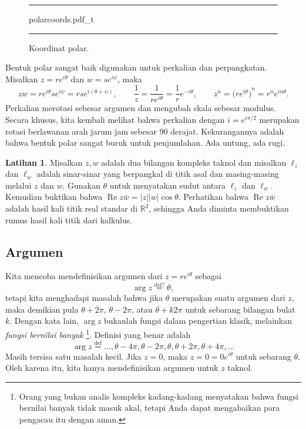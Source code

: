 \documentclass[12pt,openany]{book}
\renewcommand{\Re}{\operatorname{Re}}
\newcommand{\sabs}[1]{\lvert {#1} \rvert}
\newcommand{\R}{{\mathbb{R}}}
\newcommand{\myindex}[1]{#1\index{#1}}
\theoremstyle{plain}
\theoremstyle{remark}
\theoremstyle{definition}
\newenvironment{exbox}{%
    \def\FrameCommand{\vrule width 1pt \relax\hspace{10pt}}%
    \MakeFramed{\advance\hsize-\width\FrameRestore}%
}{%
    \endMakeFramed
}
\newenvironment{myfig}{%
\begin{figure}[h!t]
\noindent\rule{\textwidth}{0.5pt}\vspace{12pt}\par\centering}%
{\par\noindent\rule{\textwidth}{0.5pt}
\end{figure}}
\theoremstyle{exercise}
\newtheorem{exercise}{Latihan}[section]
\theoremstyle{example}
\begin{document}
\begin{myfig}
{polarcoords.pdf_t}
\caption{Koordinat polar.\label{fig:polarcoords}}
\end{myfig}

Bentuk polar sangat baik digunakan untuk perkalian dan perpangkatan.
Misalkan $z = r e^{i\theta}$ dan $w = s e^{i \psi}$, maka
\begin{equation*}
zw =
r e^{i \theta} s e^{i \psi} = 
rs e^{i (\theta+ \psi)},
\qquad
\frac{1}{z} =
\frac{1}{r e^{i \theta}} =
\frac{1}{r} e^{-i \theta} ,
\qquad
z^n =
{\bigl(r e^{i \theta}\bigr)}^n =
r^n e^{i n\theta} .
\end{equation*}
Perkalian merotasi sebesar argumen dan mengubah skala sebesar modulus.
Secara khusus, kita kembali melihat bahwa perkalian dengan $i = e^{i \pi / 2}$ merupakan
rotasi berlawanan arah jarum jam sebesar $90$ derajat.
Kekurangannya adalah bahwa bentuk polar sangat buruk untuk penjumlahan.
Ada untung, ada rugi.

\begin{exbox}
\begin{exercise}
Misalkan $z,w$ adalah dua bilangan kompleks taknol dan misalkan
$\ell_z$ dan $\ell_w$ adalah sinar-sinar yang berpangkal di titik asal dan
masing-masing melalui
$z$ dan $w$.  Gunakan $\theta$ untuk menyatakan sudut antara $\ell_z$ dan
$\ell_w$.  Kemudian buktikan bahwa
$\Re z\bar{w} = \sabs{z} \sabs{w} \cos \theta$.
Perhatikan bahwa $\Re z\bar{w}$ adalah hasil kali titik real standar di $\R^2$, sehingga
Anda diminta membuktikan rumus hasil kali titik dari kalkulus.
\end{exercise}
\end{exbox}

\subsection{Argumen}

Kita mencoba mendefinisikan argumen dari $z = re^{i\theta}$ sebagai
%
\begin{equation*}
\arg z
\overset{\text{def?}}{=}
\theta ,
\end{equation*}
tetapi kita menghadapi masalah bahwa jika $\theta$ merupakan suatu argumen dari $z$,
maka demikian pula $\theta+2\pi$, $\theta-2\pi$, atau $\theta + k 2\pi$ untuk sebarang
bilangan bulat $k$.  Dengan kata lain,
$\arg z$ bukanlah fungsi dalam pengertian klasik, melainkan
\emph{\myindex{fungsi bernilai banyak}}%
\footnote{Orang yang bukan analis kompleks kadang-kadang menyatakan bahwa fungsi bernilai banyak
tidak masuk akal, tetapi Anda dapat mengabaikan para pengacau itu dengan aman.}.  Definisi yang benar
adalah
%
\begin{equation*}
\arg z
\overset{\text{def}}{=}
\ldots,\theta - 4\pi,
\theta - 2\pi,
\theta ,
\theta + 2\pi,
\theta + 4\pi, \ldots
\end{equation*}
Masih tersisa satu masalah kecil.  Jika $z=0$, maka $z=0=0 e^{i\theta}$ untuk sebarang
$\theta$.  Oleh karena itu, kita hanya mendefinisikan argumen untuk
$z$ taknol.
\end{document}
